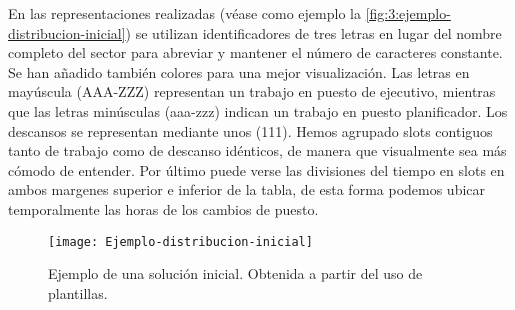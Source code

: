 En las representaciones realizadas (véase como ejemplo la \autoref{fig:3:ejemplo-distribucion-inicial}) se utilizan identificadores de tres letras en lugar del nombre completo del sector para abreviar y mantener el número de caracteres constante.
Se han añadido también colores para una mejor visualización.
Las letras en mayúscula (AAA-ZZZ) representan un trabajo en puesto de ejecutivo, mientras que las letras minúsculas (aaa-zzz) indican un trabajo en puesto planificador. Los descansos se representan mediante unos (111).
Hemos agrupado slots contiguos tanto de trabajo como de descanso idénticos, de manera que visualmente sea más cómodo de entender. Por último puede verse las divisiones del tiempo en slots en ambos margenes superior e inferior de la tabla, de esta forma podemos ubicar temporalmente las horas de los cambios de puesto.



\begin{figure}[htbp]
	\centering
	\texttt{[image: Ejemplo-distribucion-inicial]}
	\caption[Ejemplo de una solución inicial]{Ejemplo de una solución inicial. Obtenida a partir del uso 
		de plantillas.}
	\label{fig:3:ejemplo-distribucion-inicial}
\end{figure}





